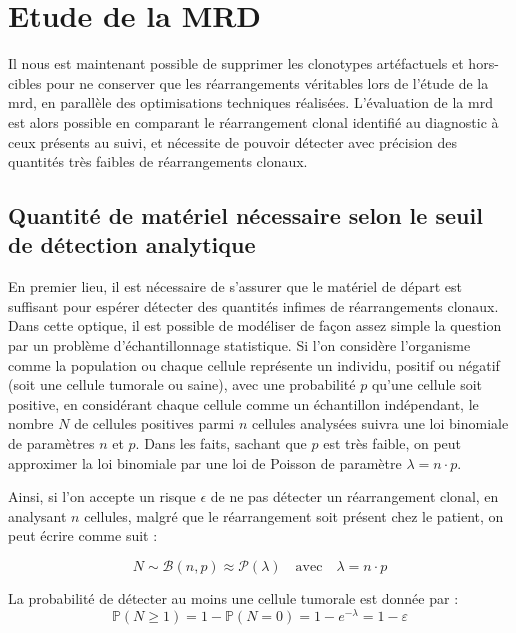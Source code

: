 \section{Etude de la MRD}

Il nous est maintenant possible de supprimer les clonotypes artéfactuels et hors-cibles pour ne conserver que les réarrangements véritables lors de 
l'étude de la \gls{mrd}, en parallèle des optimisations techniques réalisées. L'évaluation de la \gls{mrd} est alors possible en comparant le réarrangement
clonal identifié au diagnostic à ceux présents au suivi, et nécessite de pouvoir détecter avec précision des quantités très faibles de réarrangements clonaux.

\subsection{Quantité de matériel nécessaire selon le seuil de détection analytique}

En premier lieu, il est nécessaire de s'assurer que le matériel de départ est suffisant pour espérer détecter des quantités infimes de réarrangements 
clonaux. Dans cette optique, il est possible de modéliser de façon assez simple la question par un problème d'échantillonnage statistique. Si l'on considère 
l'organisme comme la population ou chaque cellule représente un individu, positif ou négatif (soit une cellule tumorale ou saine), avec une probabilité $p$ 
qu'une cellule soit positive, en considérant chaque cellule comme un échantillon indépendant, le nombre $N$ de cellules positives parmi $n$ cellules analysées 
suivra une loi binomiale de paramètres $n$ et $p$. Dans les faits, sachant que $p$ est très faible, on peut approximer la loi binomiale par une loi de Poisson de 
paramètre $\lambda = n \cdot p$. 

\vspace{1em}

Ainsi, si l'on accepte un risque $\epsilon$ de ne pas détecter un réarrangement clonal, en analysant $n$ cellules, malgré que le réarrangement soit présent chez le 
patient, on peut écrire comme suit :

\begin{equation}
    N \sim \mathcal{B}(n, p) \approx \mathcal{P}(\lambda)
    \quad \text{avec} \quad \lambda = n \cdot p
\end{equation}

La probabilité de détecter au moins une cellule tumorale est donnée par :
\begin{equation}
    \mathbb{P}(N \geq 1) = 1 - \mathbb{P}(N = 0) = 1 - e^{-\lambda} = 1 - \varepsilon
\end{equation}

